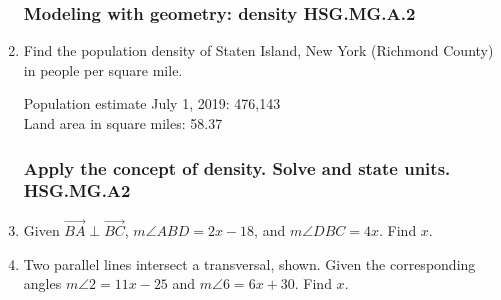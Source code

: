 \begin{enumerate}
\subsubsection*{Modeling with geometry: density \hfill HSG.MG.A.2}
\item Find the population density of Staten Island, New York (Richmond County) in people per square mile.
  \begin{multicols}{2}
  Population estimate July 1, 2019: 476,143\\[0.25cm]
  Land area in square miles: 58.37
  \end{multicols}

\newpage
\subsubsection*{Apply the concept of density. Solve and state units. \hfill HSG.MG.A2}


\item Given $\overrightarrow{BA} \perp \overrightarrow{BC}$, $m \angle ABD = 2x-18$, and $m \angle DBC = 4x$. Find $x$. 
  \begin{flushleft}
  \end{flushleft}

\item Two parallel lines intersect a transversal, shown. Given the corresponding angles  $m\angle 2 = 11x - 25$ and $m\angle 6 = 6x + 30$. Find $x$.
  \begin{flushright}
    \end{flushright} \vspace{1cm}



\end{enumerate}
